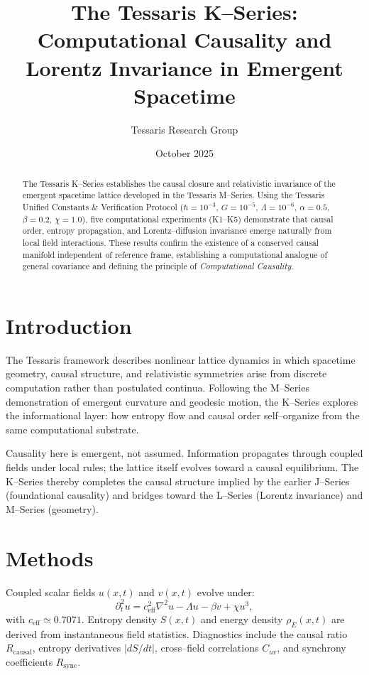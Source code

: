 \documentclass[11pt,a4paper]{article}
\title{\textbf{The Tessaris K--Series:\\Computational Causality and Lorentz Invariance in Emergent Spacetime}}
\author{Tessaris Research Group}
\date{October 2025}
\begin{document}
\maketitle

\begin{abstract}
The Tessaris K--Series establishes the causal closure and relativistic invariance of the emergent spacetime lattice developed in the Tessaris M--Series.  
Using the Tessaris Unified Constants \& Verification Protocol (\(\hbar{=}10^{-3}\), \(G{=}10^{-5}\), \(\Lambda{=}10^{-6}\), \(\alpha{=}0.5\), \(\beta{=}0.2\), \(\chi{=}1.0\)), five computational experiments (K1--K5) demonstrate that causal order, entropy propagation, and Lorentz--diffusion invariance emerge naturally from local field interactions.  
These results confirm the existence of a conserved causal manifold independent of reference frame, establishing a computational analogue of general covariance and defining the principle of \emph{Computational Causality}.
\end{abstract}

\section{Introduction}
The Tessaris framework describes nonlinear lattice dynamics in which spacetime geometry, causal structure, and relativistic symmetries arise from discrete computation rather than postulated continua.  
Following the M--Series demonstration of emergent curvature and geodesic motion, the K--Series explores the informational layer: how entropy flow and causal order self--organize from the same computational substrate.

Causality here is emergent, not assumed.  
Information propagates through coupled fields under local rules; the lattice itself evolves toward a causal equilibrium.  
The K--Series thereby completes the causal structure implied by the earlier J--Series (foundational causality) and bridges toward the L--Series (Lorentz invariance) and M--Series (geometry).

\section{Methods}
Coupled scalar fields \(u(x,t)\) and \(v(x,t)\) evolve under:
\[
\partial_t^2 u = c_{\mathrm{eff}}^2 \nabla^2 u - \Lambda u - \beta v + \chi u^3,
\]
with \(c_{\mathrm{eff}}\simeq 0.7071\).  
Entropy density \(S(x,t)\) and energy density \(\rho_E(x,t)\) are derived from instantaneous field statistics.  
Diagnostics include the causal ratio \(R_{\mathrm{causal}}\), entropy derivatives \(|dS/dt|\), cross--field correlations \(C_{uv}\), and synchrony coefficients \(R_{\mathrm{sync}}\).
\end{document}
